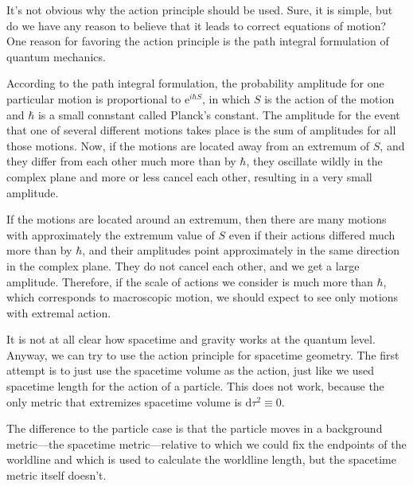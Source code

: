 \documentclass[11pt,oneside%
]{memoir}
\newcommand{\dd}{\mathrm{d}}
\newcommand{\ee}{\mathrm{e}}
\begin{document}
It's not obvious why the action principle should be used. Sure, it is simple, but do we have any reason to believe that it leads to correct equations of motion? One reason for favoring the action principle is the path integral formulation of quantum mechanics.

According to the path integral formulation, the probability amplitude for one particular motion is proportional to \(\ee^{i\hbar S}\), in which \(S\) is the action of the motion and \(\hbar\) is a small connstant called Planck's constant. The amplitude for the event that one of several different motions takes place is the sum of amplitudes for all those motions. Now, if the motions are located away from an extremum of \(S\), and they differ from each other much more than by \(\hbar\), they oscillate wildly in the complex plane and more or less cancel each other, resulting in a very small amplitude.

If the motions are located around an extremum, then there are many motions with approximately the extremum value of \(S\) even if their actions differed much more than by \(\hbar\), and their amplitudes point approximately in the same direction in the complex plane. They do not cancel each other, and we get a large amplitude. Therefore, if the scale of actions we consider is much more than \(\hbar\), which corresponds to macroscopic motion, we should expect to see only motions with extremal action.

It is not at all clear how spacetime and gravity works at the quantum level. Anyway, we can try to use the action principle for spacetime geometry. The first attempt is to just use the spacetime volume as the action, just like we used spacetime length for the action of a particle. This does not work, because the only metric that extremizes spacetime volume is \(\dd\tau^2\equiv0\).



The difference to the particle case is that the particle moves in a background metric---the spacetime metric---relative to which we could fix the endpoints of the worldline and which is used to calculate the worldline length, but the spacetime metric itself doesn't.
\end{document}
